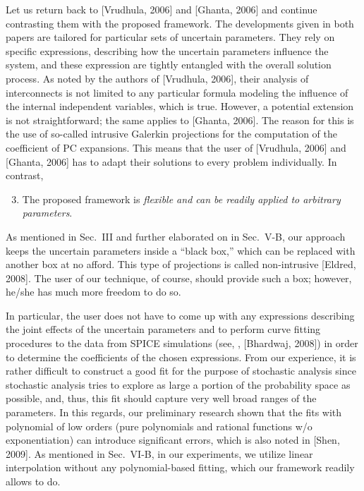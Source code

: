 \begin{authors}
Let us return back to [Vrudhula, 2006] and [Ghanta, 2006] and continue contrasting them with the proposed framework.
The developments given in both papers are tailored for particular sets of uncertain parameters.
They rely on specific expressions, describing how the uncertain parameters influence the system, and these expression are tightly entangled with the overall solution process.
As noted by the authors of [Vrudhula, 2006], their analysis of interconnects is not limited to any particular formula modeling the influence of the internal independent variables, which is true.
However, a potential extension is not straightforward; the same applies to [Ghanta, 2006].
The reason for this is the use of so-called intrusive Galerkin projections for the computation of the coefficient of PC expansions.
This means that the user of [Vrudhula, 2006] and [Ghanta, 2006] has to adapt their solutions to every problem individually.
In contrast,
\begin{enumerate}
  \setcounter{enumi}{2}
  \item The proposed framework is \emph{flexible and can be readily applied to arbitrary parameters}.
\end{enumerate}
As mentioned in Sec.~III and further elaborated on in Sec.~V-B, our approach keeps the uncertain parameters inside a ``black box,'' which can be replaced with another box at no afford.
This type of projections is called non-intrusive [Eldred, 2008].
The user of our technique, of course, should provide such a box; however, he/she has much more freedom to do so.

In particular, the user does not have to come up with any expressions describing the joint effects of the uncertain parameters and to perform curve fitting procedures to the data from SPICE simulations (see, \eg, [Bhardwaj, 2008]) in order to determine the coefficients of the chosen expressions.
From our experience, it is rather difficult to construct a good fit for the purpose of stochastic analysis since stochastic analysis tries to explore as large a portion of the probability space as possible, and, thus, this fit should capture very well broad ranges of the parameters.
In this regards, our preliminary research shown that the fits with polynomial of low orders (pure polynomials and rational functions w/o exponentiation) can introduce significant errors, which is also noted in [Shen, 2009].
As mentioned in Sec.~VI-B, in our experiments, we utilize linear interpolation without any polynomial-based fitting, which our framework readily allows to do.


\end{authors}
